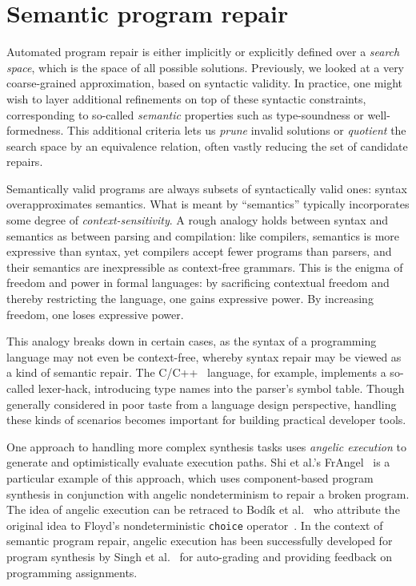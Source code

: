 \section{Semantic program repair}

Automated program repair is either implicitly or explicitly defined over a \textit{search space}, which is the space of all possible solutions. Previously, we looked at a very coarse-grained approximation, based on syntactic validity. In practice, one might wish to layer additional refinements on top of these syntactic constraints, corresponding to so-called \textit{semantic} properties such as type-soundness or well-formedness. This additional criteria lets us \textit{prune} invalid solutions or \textit{quotient} the search space by an equivalence relation, often vastly reducing the set of candidate repairs.

Semantically valid programs are always subsets of syntactically valid ones: syntax overapproximates semantics. What is meant by ``semantics'' typically incorporates some degree of \textit{context-sensitivity}. A rough analogy holds between syntax and semantics as between parsing and compilation: like compilers, semantics is more expressive than syntax, yet compilers accept fewer programs than parsers, and their semantics are inexpressible as context-free grammars. This is the enigma of freedom and power in formal languages: by sacrificing contextual freedom and thereby restricting the language, one gains expressive power. By increasing freedom, one loses expressive power.

This analogy breaks down in certain cases, as the syntax of a programming language may not even be context-free, whereby syntax repair may be viewed as a kind of semantic repair. The C/C++~\cite{mcpeak2004elkhound} language, for example, implements a so-called lexer-hack, introducing type names into the parser's symbol table. Though generally considered in poor taste from a language design perspective, handling these kinds of scenarios becomes important for building practical developer tools.

One approach to handling more complex synthesis tasks uses \textit{angelic execution} to generate and optimistically evaluate execution paths. Shi et al.'s FrAngel~\cite{shi2019frangel} is a particular example of this approach, which uses component-based program synthesis in conjunction with angelic nondeterminism to repair a broken program. The idea of angelic execution can be retraced to Bod\'ik et al.~\cite{bodik2010programming} who attribute the original idea to Floyd's nondeterministic \texttt{choice} operator~\cite{floyd1967nondeterministic}. In the context of semantic program repair, angelic execution has been successfully developed for program synthesis by Singh et al.~\cite{singh2013automated} for auto-grading and providing feedback on programming assignments.

